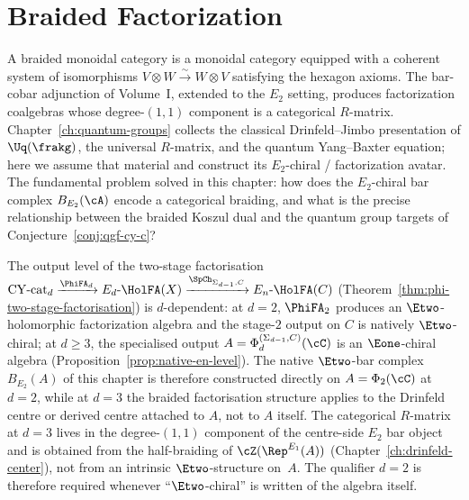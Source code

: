 \providecommand{\Cube}{\mathrm{Cube}}%

\chapter{Braided Factorization}
\label{ch:braided-factorization}

A braided monoidal category is a monoidal category equipped with a
coherent system of isomorphisms $V \otimes W \xrightarrow{\sim} W \otimes V$
satisfying the hexagon axioms. The bar-cobar adjunction of Volume~I,
extended to the $E_2$ setting, produces factorization coalgebras whose
degree-$(1,1)$ component is a categorical $R$-matrix. Chapter~\ref{ch:quantum-groups}
collects the classical Drinfeld--Jimbo presentation of $\Uq(\frakg)$, the
universal $R$-matrix, and the quantum Yang--Baxter equation; here we assume
that material and construct its $E_2$-chiral / factorization avatar. The
fundamental problem solved in this chapter: how does the $E_2$-chiral bar
complex $B_{E_2}(\cA)$ encode a categorical braiding, and what is the precise
relationship between the braided Koszul dual and the quantum group targets
of Conjecture~\ref{conj:qgf-cy-c}?

\begin{remark}[Scope: \texorpdfstring{$d = 2$}{d = 2} native vs.\ \texorpdfstring{$d = 3$}{d = 3} derived]
\label{rem:braided-fact-scope}
The output level of the two-stage factorisation $\mathrm{CY\text{-}cat}_d \xrightarrow{\PhiFA_d} E_d\text{-}\HolFA(X) \xrightarrow{\SpCh_{\Sigma_{d-1},C}} E_n\text{-}\HolFA(C)$ (Theorem~\ref{thm:phi-two-stage-factorisation}) is $d$-dependent: at $d = 2$, $\PhiFA_2$ produces an $\Etwo$-holomorphic factorization algebra and the stage-$2$ output on $C$ is natively $\Etwo$-chiral; at $d \ge 3$, the specialised output $A=\Phi_d^{(\Sigma_{d-1},C)}(\cC)$ is an $\Eone$-chiral algebra (Proposition~\ref{prop:native-en-level}). The native $\Etwo$-bar complex $B_{E_2}(A)$ of this chapter is therefore constructed directly on $A = \Phi_2(\cC)$ at $d = 2$, while at $d = 3$ the braided factorisation structure applies to the Drinfeld centre or derived centre attached to $A$, not to $A$ itself. The categorical $R$-matrix at $d = 3$ lives in the degree-$(1,1)$ component of the centre-side $E_2$ bar object and is obtained from the half-braiding of $\cZ(\Rep^{E_1}(A))$ (Chapter~\ref{ch:drinfeld-center}), not from an intrinsic $\Etwo$-structure on~$A$. The qualifier $d = 2$ is therefore required whenever ``$\Etwo$-chiral'' is written of the algebra itself.
\end{remark}

